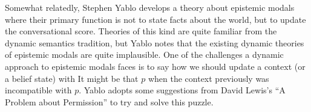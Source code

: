 Somewhat relatedly, Stephen Yablo develops a theory about epistemic modals where their primary function is not to state facts about the world, but to update the conversational score. Theories of this kind are quite familiar from the dynamic semantics tradition, but Yablo notes that the existing dynamic theories of epistemic modals are quite implausible. One of the challenges a dynamic approach to epistemic modals faces is to say how we should update a context (or a belief state) with It might be that $p$ when the context previously was incompatible with $p$. Yablo adopts some suggestions from David Lewis's ``A Problem about Permission'' \citep{Lewis1979a} to try and solve this puzzle.

%
%
%
